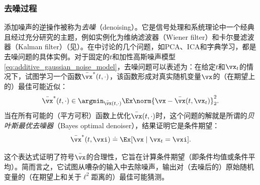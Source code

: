 \documentclass[../../book-main_zh.tex]{subfiles}
\begin{document}
\subsubsection{去噪过程}
添加噪声的逆操作被称为\textit{去噪}（denoising）。它是信号处理和系统理论中一个经典且经过充分研究的主题，例如实例化为维纳滤波器（Wiener filter）和卡尔曼滤波器（Kalman filter）（见）。在中讨论的几个问题，如PCA、ICA和字典学习，都是去噪问题的具体实例。对于固定的\(t\)和加性高斯噪声模型\eqref{eq:additive_gaussian_noise_model}，去噪问题可以表述为：在给定\(t\)和\(\vx_{t}\)的情况下，试图学习一个函数\(\bar{\vx}^{\ast}(t, \cdot)\)，该函数形成对真实随机变量\(\vx\)的（在期望上的）最佳可能近似：
\begin{equation}\label{eq:denoising_loss}
    \bar{\vx}^{\ast}(t, \cdot) \in \argmin_{\bar{\vx}(t,
    \cdot)}\Ex\norm{\vx - \bar{\vx}(t, \vx_{t})}_{2}^{2}.
\end{equation}
当在所有可能的（平方可积）函数上优化\(\bar{\vx}(t, \cdot)\)时，这个问题的解就是所谓的\textit{贝叶斯最优去噪器}（Bayes optimal denoiser），结果证明它是条件期望：
\begin{equation}\label{eq:optimal_denoiser}
    \bar{\vx}^{\ast}(t, \vxi) \doteq \Ex[\vx \mid \vx_{t} = \vxi].
\end{equation}

这个表达式证明了符号\(\bar{\vx}\)的合理性，它旨在计算条件期望（即条件均值或条件平均）。简而言之，它试图从嘈杂的输入中去除噪声，输出对（去噪后的）原始随机变量的（在期望上和关于\(\ell^{2}\)距离的）最佳可能猜测。
\end{document}
